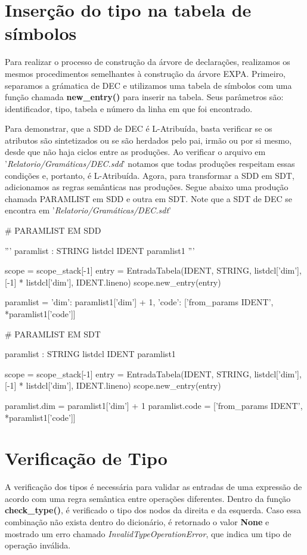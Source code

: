 \documentclass[
	12pt,				%
	openright,			%
	twoside,			%
	a4paper,			%
	english,			%
	french,				%
	spanish,			%
	brazil				%
	]{abntex2}
\begin{document}
\section{Inserção do tipo na tabela de símbolos}
Para realizar o processo de construção da árvore de declarações,
realizamos os mesmos procedimentos semelhantes à construção da árvore EXPA.
Primeiro, separamos a grámatica de DEC e utilizamos uma tabela de símbolos 
com uma função chamada \textbf{new\_entry()} para inserir na tabela. Seus parâmetros são: identificador, tipo, tabela e número da linha
em que foi encontrado.

Para demonstrar, que a SDD de DEC é L-Atribuída, basta verificar se os atributos são
sintetizados ou se são herdados pelo pai, irmão ou por si mesmo, desde que não haja ciclos entre as produções.
Ao verificar o arquivo em '\emph{Relatorio/Gramáticas/DEC.sdd}' notamos que todas produções respeitam essas condições e, portanto,
é L-Atribuída. Agora, para transformar a SDD em SDT, adicionamos as regras semânticas nas produções.
Segue abaixo uma produção chamada PARAMLIST em SDD e outra em SDT. Note que a SDT de DEC se encontra em 
'\emph{Relatorio/Gramáticas/DEC.sdt}'

\begin{python}
# PARAMLIST EM SDD

'''
paramlist : STRING listdcl IDENT paramlist1 
'''

scope = scope_stack[-1]
entry = EntradaTabela(IDENT, STRING, listdcl['dim'], [-1] * listdcl['dim'], IDENT.lineno)
scope.new_entry(entry)

paramlist = { 'dim': paramlist1['dim'] + 1, 'code': ['from_params {IDENT}', *paramlist1['code']] }    
\end{python}

\begin{python}
# PARAMLIST EM SDT

paramlist : STRING listdcl IDENT paramlist1 {
    scope = scope_stack[-1]
    entry = EntradaTabela(IDENT, STRING, listdcl['dim'], [-1] * listdcl['dim'], IDENT.lineno)
    scope.new_entry(entry)

    paramlist.dim = paramlist1['dim'] + 1
    paramlist.code = ['from_params {IDENT}', *paramlist1['code']]
}

\end{python}
\section{Verificação de Tipo}
A verificação dos tipos é necessária para validar as entradas de uma expressão
de acordo com uma regra semântica entre operações diferentes. Dentro da função
\textbf{check\_type()}, é verificado o tipo dos nodos da direita e da esquerda. Caso essa combinação
não exista dentro do dicionário, é retornado o valor \textbf{None} e mostrado um erro chamado
\emph{InvalidTypeOperationError}, que indica um tipo de operação inválida.
\end{document}
